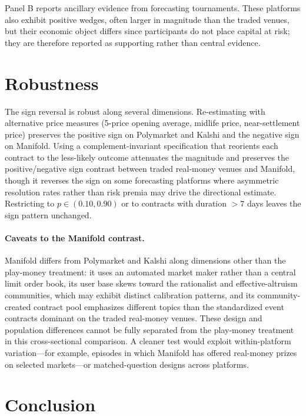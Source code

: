 \documentclass[12pt]{article}
\begin{document}
Panel B reports ancillary evidence from forecasting tournaments. These platforms also exhibit positive wedges, often larger in magnitude than the traded venues, but their economic object differs since participants do not place capital at risk; they are therefore reported as supporting rather than central evidence.

\section{Robustness}\label{sec:robustness}

The sign reversal is robust along several dimensions. Re-estimating with alternative price measures (5-price opening average, midlife price, near-settlement price) preserves the positive sign on Polymarket and Kalshi and the negative sign on Manifold. Using a complement-invariant specification that reorients each contract to the less-likely outcome attenuates the magnitude and preserves the positive/negative sign contrast between traded real-money venues and Manifold, though it reverses the sign on some forecasting platforms where asymmetric resolution rates rather than risk premia may drive the directional estimate. Restricting to $p \in (0.10, 0.90)$ or to contracts with duration $> 7$ days leaves the sign pattern unchanged.

\paragraph{Caveats to the Manifold contrast.} Manifold differs from Polymarket and Kalshi along dimensions other than the play-money treatment: it uses an automated market maker rather than a central limit order book, its user base skews toward the rationalist and effective-altruism communities, which may exhibit distinct calibration patterns, and its community-created contract pool emphasizes different topics than the standardized event contracts dominant on the traded real-money venues. These design and population differences cannot be fully separated from the play-money treatment in this cross-sectional comparison. A cleaner test would exploit within-platform variation---for example, episodes in which Manifold has offered real-money prizes on selected markets---or matched-question designs across platforms.

\section{Conclusion}
\end{document}
